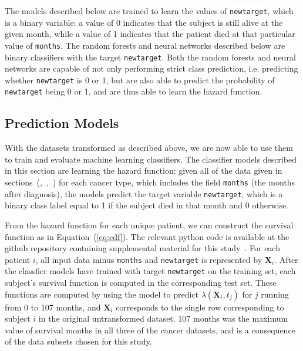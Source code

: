 \documentclass[10pt,letterpaper]{article}
\newcommand{\codewhite}[1]{\colorbox{white}{\texttt{#1}}}
\begin{document}
The models described below are trained to learn the values of \codewhite{newtarget}, which is a binary variable: a value of 0 indicates that the subject is still alive at the given month, while a value of 1 indicates that the patient died at that particular value of \codewhite{months}. The random forests and neural networks described below are binary classifiers with the target \codewhite{newtarget}. 
Both the random forests and neural networks are capable of not only performing strict class prediction, i.e. predicting whether \codewhite{newtarget} is 0 or 1, but are also able to predict the probability of \codewhite{newtarget} being 0 or 1, and are thus able to learn the hazard function.






\subsection{Prediction Models}
\label{sec:predmodels}

With the datasets transformed as described above, we are now able to use them to train and evaluate machine learning classifiers.
The classifier models described in this section are learning the hazard function: given all of the data given in sections~(,~,~) for each cancer type, which includes the field \codewhite{months} (the months after diagnosis), the models predict the target variable \codewhite{newtarget}, which is a binary class label equal to 1 if the subject died in that month and 0 otherwise.




From the hazard function for each unique patient, we can construct the
survival function as in Equation~(\ref{eq:cdf}).
The relevant python code is available at the github repository containing supplemental material for this study~\cite{supp}.
For each patient $i$, all input data minus \codewhite{months} and \codewhite{newtarget} is represented by $\mathbf{X}_{i}$. After the classfier models have trained with target \codewhite{newtarget} on the training set, each subject's survival function is computed in the corresponding test set.
These functions are computed by using the model to predict $\lambda(\mathbf{X}_i, t_{j})$ for $j$ running from 0 to 107 months, and $\mathbf{X}_{i}$ corresponds to the single row corresponding to subject $i$ in the original untransformed dataset.
107 months was the maximum value of survival months in all three of the cancer datasets, and is a consequence of the data subsets chosen for this study.
\end{document}
